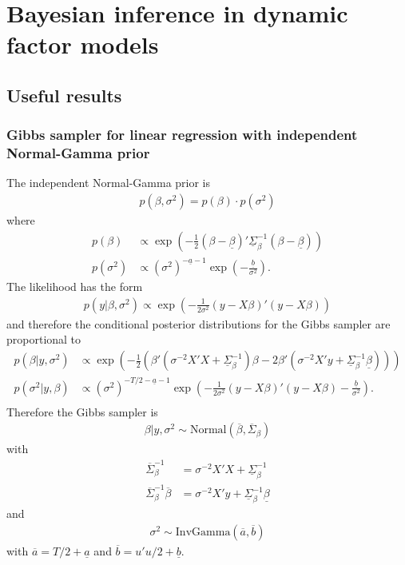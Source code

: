 \documentclass[12pt,a4paper]{scrartcl}
\begin{document}
\section{Bayesian inference in dynamic factor models}

\subsection{Useful results}

\subsubsection*{Gibbs sampler for linear regression with independent Normal-Gamma prior}

The independent Normal-Gamma prior is
\begin{align}
p(\beta, \sigma^2) = p(\beta) \cdot p(\sigma^2)
\end{align}
where 
\begin{align}
p(\beta) &\propto \exp\left(-\frac{1}{2}(\beta-\underline{\beta})'\underline{\Sigma}_\beta^{-1}(\beta-\underline{\beta})\right) \\
p(\sigma^2) &\propto (\sigma^2)^{-\underline{a} - 1} \exp\left(-\frac{\underline{b}}{\sigma^2}\right).
\end{align}
The likelihood has the form
\begin{align}
p(y|\beta, \sigma^2) \propto \exp\left(-\frac{1}{2\sigma^2}(y-X\beta)'(y-X\beta)\right)
\end{align}
and therefore the conditional posterior distributions for the Gibbs sampler are proportional to
\begin{align}
p(\beta|y, \sigma^2) &\propto \exp\left(-\frac{1}{2}\left(\beta'(\sigma^{-2}X'X + \underline{\Sigma}_\beta^{-1})\beta - 2\beta'(\sigma^{-2}X'y + \underline{\Sigma}_\beta^{-1}\underline{\beta})\right)\right)\\
p(\sigma^2|y, \beta) &\propto (\sigma^2)^{-T/2-\underline{a} - 1} \exp\left(-\frac{1}{2\sigma^2}(y-X\beta)'(y-X\beta)-\frac{\underline{b}}{\sigma^2}\right).\\
\end{align}
Therefore the Gibbs sampler is
\begin{align}
\beta|y, \sigma^2 \sim \mathrm{Normal}(\overline{\beta}, \overline{\Sigma}_\beta)
\end{align}
with
\begin{align}
\overline{\Sigma}_\beta^{-1} &= \sigma^{-2}X'X + \underline{\Sigma}_\beta^{-1}\\
\overline{\Sigma}_\beta^{-1} \overline{\beta} &= \sigma^{-2}X'y + \underline{\Sigma}_\beta^{-1}\underline{\beta}
\end{align}
and
\begin{align}
\sigma^2 \sim \mathrm{InvGamma}(\overline{a}, \overline{b})
\end{align}
with $\overline{a} = T/2 + \underline{a}$ and $\overline{b} = u'u/2 + \underline{b}$.
\end{document}
